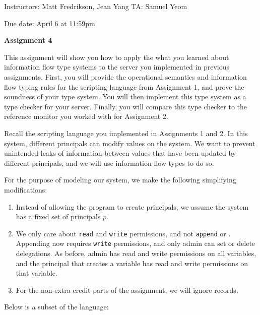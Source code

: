 \documentclass[11pt]{article}
\newcommand*{\stuname}{}
\newcommand*{\assignmentnumb}{4}
\begin{document}
\centerline{Instructors: Matt Fredrikson, Jean Yang \hfill TA: Samuel Yeom} 
\vspace{0.5ex}
Due date: April 6 at 11:59pm \\
\vspace{1.5ex}
\centerline{\Large\bf Assignment \assignmentnumb}
\vspace{0.5ex}
\centerline{\Large\bf \stuname}

This assignment will show you how to apply the what you learned about information flow type systems to the server you implemented in previous assignments. First, you will provide the operational semantics and information flow typing rules for the scripting language from Assignment 1, and prove the soundness of your type system. You will then implement this type system as a type checker for your server. Finally, you will compare this type checker to the reference monitor you worked with for Assignment 2.

Recall the scripting language you implemented in Assignments 1 and 2. In this system, different principals can modify values on the system. We want to prevent unintended leaks of information between values that have been updated by different principals, and we will use information flow types to do so.

For the purpose of modeling our system, we make the following simplifying modifications:
\begin{enumerate}
\item Instead of allowing the program to create principals, we assume the system has a fixed set of principals $p$.
\item We only care about \texttt{read} and \texttt{write} permissions, and not \texttt{append} or . Appending now requires \texttt{write} permissions, and only admin can set or delete delegations. As before, admin has read and write permissions on all variables, and the principal that creates a variable has read and write permissions on that variable.
\item For the non-extra credit parts of the assignment, we will ignore records.
\end{enumerate}
Below is a subset of the language:
\end{document}
